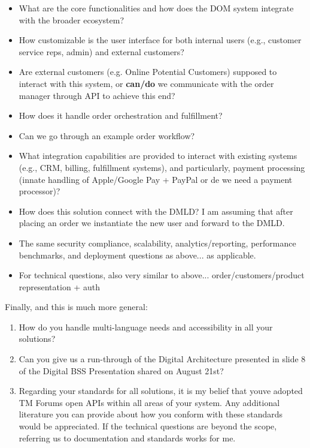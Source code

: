 \documentclass[
]{article}
\providecommand{\tightlist}{%
  \setlength{\itemsep}{0pt}\setlength{\parskip}{0pt}}
\begin{document}
\begin{itemize}
\tightlist
\item
  What are the core functionalities and how does the DOM system
  integrate with the broader ecosystem?
\item
  How customizable is the user interface for both internal users (e.g.,
  customer service reps, admin) and external customers?
\item
  Are external customers (e.g. Online Potential Customers) supposed to
  interact with this system, or \textbf{can/do} we communicate with the
  order manager through API to achieve this end?
\item
  How does it handle order orchestration and fulfillment?
\item
  Can we go through an example order workflow?
\item
  What integration capabilities are provided to interact with existing
  systems (e.g., CRM, billing, fulfillment systems), and particularly,
  payment processing (innate handling of Apple/Google Pay + PayPal or de
  we need a payment processor)?
\item
  How does this solution connect with the DMLD? I am assuming that after
  placing an order we instantiate the new user and forward to the DMLD.
\item
  The same security compliance, scalability, analytics/reporting,
  performance benchmarks, and deployment questions as above... as
  applicable.
\item
  For technical questions, also very similar to above...
  order/customers/product representation + auth
\end{itemize}

Finally, and this is much more general:

\begin{enumerate}
\tightlist
\item
  How do you handle multi-language needs and accessibility in all your
  solutions?
\item
  Can you give us a run-through of the Digital Architecture presented in
  slide 8 of the Digital BSS Presentation shared on August 21st?
\item
  Regarding your standards for all solutions, it is my belief that
  you\textquotesingle ve adopted TM Forum\textquotesingle s open APIs
  within all areas of your system. Any additional literature you can
  provide about how you conform with these standards would be
  appreciated. If the technical questions are beyond the scope,
  referring us to documentation and standards works for me.
\end{enumerate}
\end{document}

